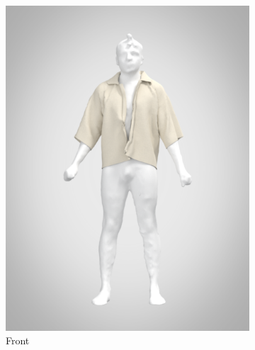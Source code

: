 \begin{figure}[H]
    \centering
    \begin{subfigure}[b]{0.3\textwidth}
        \centering
        \includegraphics[width=\textwidth]{Images/renderfront.png}
        \caption{Front}
    \end{subfigure}
    \hfill
    \begin{subfigure}[b]{0.3\textwidth}
        \centering

\end{subfigure}
\end{figure}
